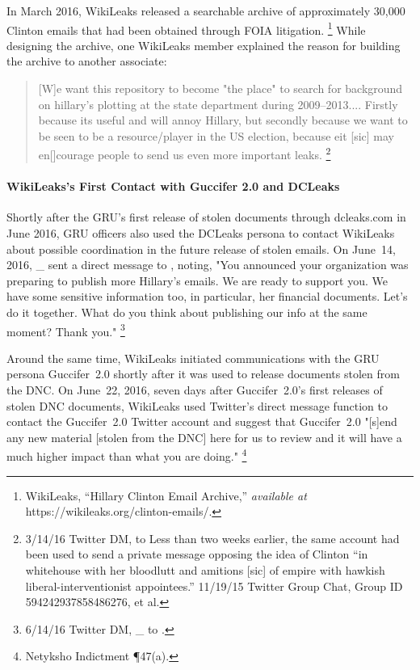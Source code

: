 In March 2016, WikiLeaks released a searchable archive of approximately 30,000 Clinton emails that had been obtained through FOIA litigation.%
\footnote{WikiLeaks, “Hillary Clinton Email Archive,” \textit{available at} https://wikileaks.org/clinton-emails/.}
While designing the archive, one WikiLeaks member explained the reason for building the archive to another associate:

\begin{quote}
[W]e want this repository to become "the place" to search for background on hillary's plotting at the state department during 2009--2013....
Firstly because its useful and will annoy Hillary, but secondly because we want to be seen to be a resource/player in the US election, because eit [sic] may en[]courage people to send us even more important leaks.%
\footnote{3/14/16 Twitter DM, \@WikiLeaks to 
Less than two weeks earlier, the same account had been used to send a private message opposing the idea of Clinton “in whitehouse with her bloodlutt and amitions [sic] of empire with hawkish liberal-interventionist appointees.” 11/19/15 Twitter Group Chat, Group ID 594242937858486276, \@WikiLeaks et al.}
\end{quote}

\paragraph{WikiLeaks's First Contact with Guccifer 2.0 and DCLeaks}

Shortly after the GRU's first release of stolen documents through dcleaks.com in June 2016, GRU officers also used the DCLeaks persona to contact WikiLeaks about possible coordination in the future release of stolen emails.
On June~14, 2016, \@dcleaks\_ sent a direct message to \@WikiLeaks, noting, "You announced your organization was preparing to publish more Hillary's emails.
We are ready to support you.
We have some sensitive information too, in particular, her financial documents.
Let's do it together.
What do you think about publishing our info at the same moment?
Thank you."%
\footnote{6/14/16 Twitter DM, \@dcleaks\_ to \@WikiLeaks.}

Around the same time, WikiLeaks initiated communications with the GRU persona Guccifer~2.0 shortly after it was used to release documents stolen from the DNC\null.
On June~22, 2016, seven days after Guccifer~2.0's first releases of stolen DNC documents, WikiLeaks used Twitter's direct message function to contact the Guccifer~2.0 Twitter account and suggest that Guccifer~2.0 "[s]end any new material [stolen from the DNC] here for us to review and it will have a much higher impact than what you are doing."%
\footnote{Netyksho Indictment \P 47(a).}

